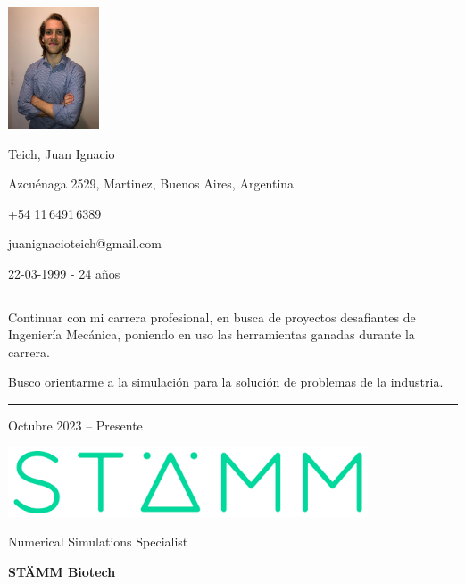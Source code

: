 \documentclass[a4paper,10pt]{article}
\newlength{\cvcolumngapwidth}
\newlength{\cvleftcolumnwidth}
\newlength{\cvrightcolumnwidth}
\newcommand{\cvnamestyle}[1]{{\Large\cvnamefont\textcolor{cvnamecolor}{#1}}}
\newcommand{\cvsectionstyle}[1]{{\normalsize\cvsectionfont\textcolor{cvsectioncolor}{#1}}}
\newcommand{\cvtitlestyle}[1]{{\large\cvtitlefont\textcolor{cvtitlecolor}{#1}}}
\newcommand{\cvdurationstyle}[1]{{\small\cvdurationfont\textcolor{cvdurationcolor}{#1}}}
\newcommand{\cvheadingstyle}[1]{{\normalsize\cvheadingfont\textcolor{cvheadingcolor}{#1}}}
\newlength{\cvafteritemskipamount}
\newlength{\cvaftersectionskipamount}
\newlength{\cvbetweensectionandheadingextraskipamount}
\newlength{\cvafternameskipamount}
\newlength{\cvafterpersonalinfolineskipamount}
\newlength{\cvaftertitleskipamount}
\newlength{\cvparskip}
\newcommand{\cvpersonalinfo}[2]{
    \begin{minipage}[t]{\cvleftcolumnwidth}
        \vspace{0mm} %
        \raggedleft #1
    \end{minipage}%
    \hspace{\cvcolumngapwidth}%
    \begin{minipage}[t]{\cvrightcolumnwidth}
        \vspace{0mm} %
        #2
    \end{minipage}

    \vspace{\cvafteritemskipamount}
}
\newcommand{\cvname}[1]{
    \cvnamestyle{#1}

    \vspace{\cvafternameskipamount}
}
\newcommand{\cvpersonalinfolinewithicon}[3]{
    \raisebox{.5\fontcharht\font`E-.5\height}{\texttt{[image: \#2]}}
    #3

    \vspace{\cvafterpersonalinfolineskipamount}
}
\newcommand{\cvsection}[1]{
    \begin{minipage}[t]{\cvleftcolumnwidth}
        \raggedleft\cvsectionstyle{#1}
    \end{minipage}%
    \hspace{\cvcolumngapwidth}%
    \begin{minipage}[t]{\cvrightcolumnwidth}
        \textcolor{cvrulecolor}{\rule{\cvrightcolumnwidth}{0.3mm}}
    \end{minipage}

    \vspace{\cvaftersectionskipamount}
}
\newcommand{\cvitem}[2]{
    \begin{minipage}[t]{\cvleftcolumnwidth}
        \raggedleft #1
    \end{minipage}%
    \hspace{\cvcolumngapwidth}%
    \begin{minipage}[t]{\cvrightcolumnwidth}
        \setlength{\parskip}{\cvparskip} #2
    \end{minipage}

    \vspace{\cvafteritemskipamount}
}
\newcommand{\cvtitle}[1]{
    \cvtitlestyle{#1}

    \vspace{\cvaftertitleskipamount}
    \vspace{-\cvparskip}
}
\begin{document}

\cvpersonalinfo{
    \includegraphics[height=36mm]{photo.jpg}
}{
    \cvname{Teich, Juan Ignacio}

    \cvpersonalinfolinewithicon{height=4mm}{../logos-photos/072-location.pdf}{
        Azcuénaga 2529, Martinez, Buenos Aires, Argentina
    }

    \cvpersonalinfolinewithicon{height=4mm}{../logos-photos/067-phone.pdf}{
        +54 11\,6491\,6389
    }

    \cvpersonalinfolinewithicon{height=4mm}{../logos-photos/070-envelop.pdf}{
        juanignacioteich@gmail.com
    }


        22-03-1999  -   24 años
}


\cvsection{OBJETIVOS PROFESIONALES}

\vspace{\cvbetweensectionandheadingextraskipamount}
\cvitem{\cvheadingstyle{}}{
    Continuar con mi carrera profesional, en busca de proyectos desafiantes de Ingeniería Mecánica, poniendo en uso las herramientas ganadas durante la carrera.

    Busco orientarme a la simulación para la solución de problemas de la industria.
}


\cvsection{EXPERIENCIA LABORAL}

\cvitem{
	\cvdurationstyle{Octubre 2023 -- Presente}
}{
	\begin{minipage}{0.1\textwidth}
		\centering
		\includegraphics[width=0.8\textwidth]{../logos-photos/Logo_STAMM.png}   
	\end{minipage}
	\cvtitle{Numerical Simulations Specialist}
	
	\textbf{STÄMM Biotech}
	
	
}
\end{document}
